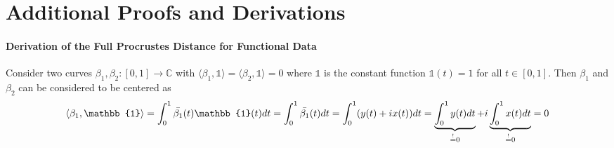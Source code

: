 \section{Additional Proofs and Derivations}

\paragraph{Derivation of the Full Procrustes Distance for Functional Data}
\label{app:deriv-full-proc-dist}
Consider two curves $\beta_1, \beta_2 : [0,1] \rightarrow \mathbb{C}$ with $\langle \beta_1, \mathbb{1} \rangle = \langle \beta_2, \mathbb{1} \rangle = 0$ where $\mathbb{1}$ is the constant function $\mathbb{1}(t) = 1$ for all $t \in [0,1]$.
Then $\beta_1$ and $\beta_2$ can be considered to be centered as
$$ \langle \beta_1, \mathbb{1} \rangle
= \int_0^1 \bar{\beta_1}(t)\mathbb{1}(t)dt\\
= \int_0^1 \bar{\beta_1}(t)dt
= \int_0^1 (y(t) + i x(t))dt
= \underbrace{\int_0^1 y(t)dt}_{\stackrel{!}{=}0} + i \underbrace{\int_0^1 x(t)dt}_{\stackrel{!}{=}0} = 0 $$

